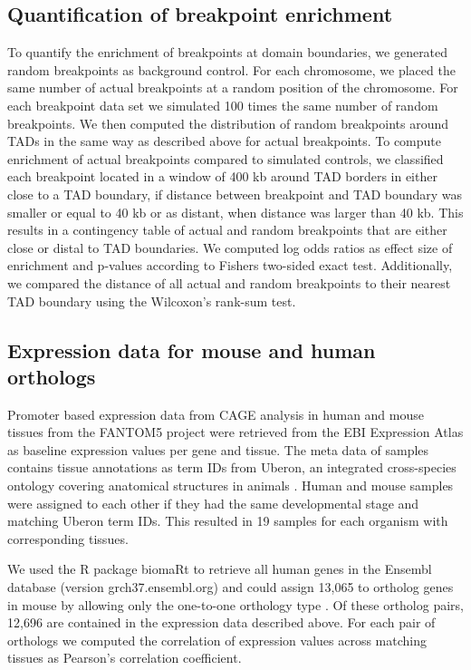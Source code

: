 \documentclass[a4paper,twoside=true,openright,parskip=full,chapterprefix=true,11pt,headings=normal,bibliography=totoc,listof=totoc,titlepage=on,captions=tableabove,draft=false]{scrreprt}
\theoremstyle{definition}
\theoremstyle{definition}
\theoremstyle{definition}
\theoremstyle{remark}
\begin{document}
\hypertarget{quantification-of-breakpoint-enrichment}{%
\subsection{Quantification of breakpoint
enrichment}\label{quantification-of-breakpoint-enrichment}}

To quantify the enrichment of breakpoints at domain boundaries, we
generated random breakpoints as background control. For each chromosome,
we placed the same number of actual breakpoints at a random position of
the chromosome. For each breakpoint data set we simulated 100 times the
same number of random breakpoints. We then computed the distribution of
random breakpoints around TADs in the same way as described above for
actual breakpoints. To compute enrichment of actual breakpoints compared
to simulated controls, we classified each breakpoint located in a window
of 400 kb around TAD borders in either close to a TAD boundary, if
distance between breakpoint and TAD boundary was smaller or equal to 40
kb or as distant, when distance was larger than 40 kb. This results in a
contingency table of actual and random breakpoints that are either close
or distal to TAD boundaries. We computed log odds ratios as effect size
of enrichment and p-values according to Fishers two-sided exact test.
Additionally, we compared the distance of all actual and random
breakpoints to their nearest TAD boundary using the Wilcoxon's rank-sum
test.

\hypertarget{expression-data-for-mouse-and-human-orthologs}{%
\subsection{Expression data for mouse and human
orthologs}\label{expression-data-for-mouse-and-human-orthologs}}

Promoter based expression data from CAGE analysis in human and mouse
tissues from the FANTOM5 project \citep{Forrest2014} were retrieved from
the EBI Expression Atlas \citep{Hinrichs2006} as baseline expression
values per gene and tissue. The meta data of samples contains tissue
annotations as term IDs from Uberon, an integrated cross-species
ontology covering anatomical structures in animals \citep{Herrero2016}.
Human and mouse samples were assigned to each other if they had the same
developmental stage and matching Uberon term IDs. This resulted in 19
samples for each organism with corresponding tissues.

We used the R package biomaRt to retrieve all human genes in the Ensembl
database (version grch37.ensembl.org) and could assign 13,065 to
ortholog genes in mouse by allowing only the one-to-one orthology type
\citep{Herrero2016}. Of these ortholog pairs, 12,696 are contained in
the expression data described above. For each pair of orthologs we
computed the correlation of expression values across matching tissues as
Pearson's correlation coefficient.
\end{document}
